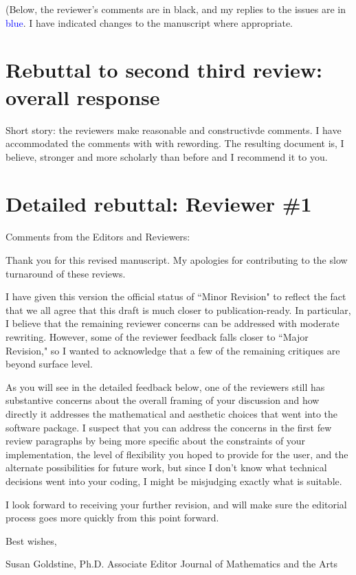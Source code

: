 \documentclass[12pt]{article}
\begin{document}
(Below, the reviewer's comments are in black, and my replies to the
issues are in \textcolor{blue}{blue}.  I have indicated changes to the
manuscript where appropriate.

\section*{Rebuttal to second third review: overall response}

Short story: the reviewers make reasonable and constructivde comments.
I have accommodated the comments with  with rewording.  The resulting
document is, I believe, stronger and more scholarly than before and I
recommend it to you.


\section*{Detailed rebuttal: Reviewer \#1}


Comments from the Editors and Reviewers:

Thank you for this revised manuscript.  My apologies for contributing
to the slow turnaround of these reviews.

I have given this version the official status of ``Minor Revision" to
reflect the fact that we all agree that this draft is much closer to
publication-ready. In particular, I believe that the remaining
reviewer concerns can be addressed with moderate rewriting.  However,
some of the reviewer feedback falls closer to ``Major Revision," so I
wanted to acknowledge that a few of the remaining critiques are beyond
surface level.

As you will see in the detailed feedback below, one of the reviewers
still has substantive concerns about the overall framing of your
discussion and how directly it addresses the mathematical and
aesthetic choices that went into the software package.  I suspect that
you can address the concerns in the first few review paragraphs by
being more specific about the constraints of your implementation, the
level of flexibility you hoped to provide for the user, and the
alternate possibilities for future work, but since I don't know what
technical decisions went into your coding, I might be misjudging
exactly what is suitable.

I look forward to receiving your further revision, and will make sure
the editorial process goes more quickly from this point forward.

Best wishes,

Susan Goldstine, Ph.D.
Associate Editor
Journal of Mathematics and the Arts
\end{document}
